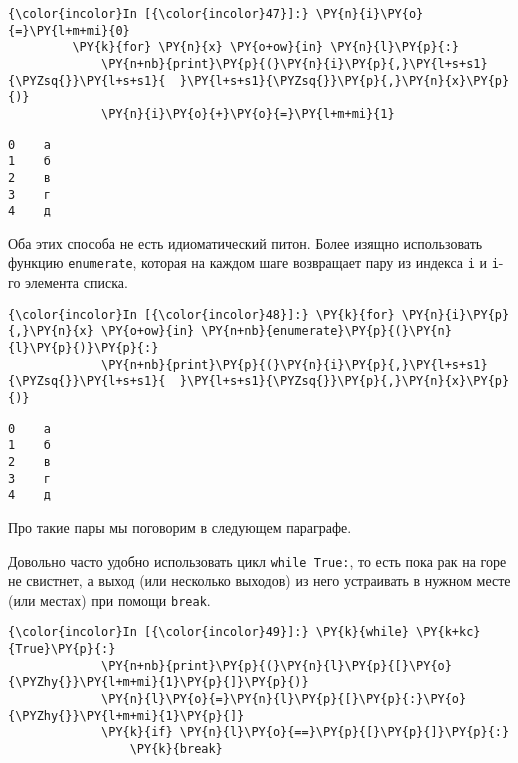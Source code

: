     \begin{Verbatim}[commandchars=\\\{\}]
{\color{incolor}In [{\color{incolor}47}]:} \PY{n}{i}\PY{o}{=}\PY{l+m+mi}{0}
         \PY{k}{for} \PY{n}{x} \PY{o+ow}{in} \PY{n}{l}\PY{p}{:}
             \PY{n+nb}{print}\PY{p}{(}\PY{n}{i}\PY{p}{,}\PY{l+s+s1}{\PYZsq{}}\PY{l+s+s1}{  }\PY{l+s+s1}{\PYZsq{}}\PY{p}{,}\PY{n}{x}\PY{p}{)}
             \PY{n}{i}\PY{o}{+}\PY{o}{=}\PY{l+m+mi}{1}
\end{Verbatim}

    \begin{Verbatim}[commandchars=\\\{\}]
0    а
1    б
2    в
3    г
4    д

    \end{Verbatim}

    Оба этих способа не есть идиоматический питон. Более изящно использовать
функцию \texttt{enumerate}, которая на каждом шаге возвращает пару из
индекса \texttt{i} и \texttt{i}-го элемента списка.

    \begin{Verbatim}[commandchars=\\\{\}]
{\color{incolor}In [{\color{incolor}48}]:} \PY{k}{for} \PY{n}{i}\PY{p}{,}\PY{n}{x} \PY{o+ow}{in} \PY{n+nb}{enumerate}\PY{p}{(}\PY{n}{l}\PY{p}{)}\PY{p}{:}
             \PY{n+nb}{print}\PY{p}{(}\PY{n}{i}\PY{p}{,}\PY{l+s+s1}{\PYZsq{}}\PY{l+s+s1}{  }\PY{l+s+s1}{\PYZsq{}}\PY{p}{,}\PY{n}{x}\PY{p}{)}
\end{Verbatim}

    \begin{Verbatim}[commandchars=\\\{\}]
0    а
1    б
2    в
3    г
4    д

    \end{Verbatim}

    Про такие пары мы поговорим в следующем параграфе.

Довольно часто удобно использовать цикл \texttt{while\ True:}, то есть
пока рак на горе не свистнет, а выход (или несколько выходов) из него
устраивать в нужном месте (или местах) при помощи \texttt{break}.

    \begin{Verbatim}[commandchars=\\\{\}]
{\color{incolor}In [{\color{incolor}49}]:} \PY{k}{while} \PY{k+kc}{True}\PY{p}{:}
             \PY{n+nb}{print}\PY{p}{(}\PY{n}{l}\PY{p}{[}\PY{o}{\PYZhy{}}\PY{l+m+mi}{1}\PY{p}{]}\PY{p}{)}
             \PY{n}{l}\PY{o}{=}\PY{n}{l}\PY{p}{[}\PY{p}{:}\PY{o}{\PYZhy{}}\PY{l+m+mi}{1}\PY{p}{]}
             \PY{k}{if} \PY{n}{l}\PY{o}{==}\PY{p}{[}\PY{p}{]}\PY{p}{:}
                 \PY{k}{break}
\end{Verbatim}

